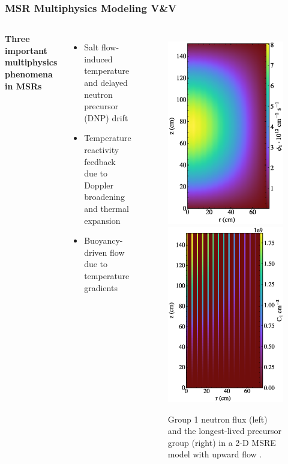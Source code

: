 \begin{frame}
  \frametitle{MSR Multiphysics Modeling V\&V}
  \begin{columns}
    \column{5.5cm}
      \textbf{Three important multiphysics phenomena in MSRs}
      \begin{itemize}
        \item Salt flow-induced temperature and delayed neutron precursor (DNP) drift
        \item Temperature reactivity feedback due to Doppler broadening and thermal expansion
        \item Buoyancy-driven flow due to temperature gradients
      \end{itemize}
    \column{5.5cm}
      \begin{figure}
        \centering
        \includegraphics[width=.48\columnwidth]{../images/2d_gamma_heating_group1}
        \includegraphics[width=.48\columnwidth]{images/2d_gamma_heating_pre1_scaled}
        \caption{Group 1 neutron flux (left) and the longest-lived precursor group (right) in a 2-D
        MSRE model with upward flow \cite{lindsay_introduction_2018}.}
      \end{figure}
  \end{columns}
\end{frame}
